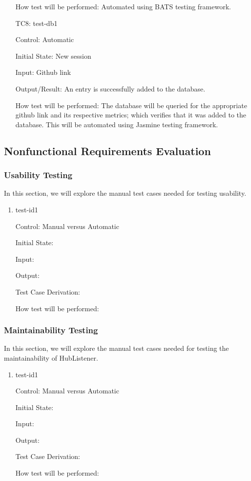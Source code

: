 \documentclass[12pt, titlepage]{article}
\begin{document}
\begin{enumerate}
How test will be performed: Automated using BATS testing framework. 

\item[TC8:] test-db1 

Control: Automatic 
					
Initial State: New session
					
Input: Github link
					
Output/Result: An entry is successfully added to the database.
				
How test will be performed: The database will be queried for the appropriate github link and its respective metrics; which verifies that it was added to the database. This will be automated using Jasmine testing framework.  

\end{enumerate}

\iffalse
\subsection{Nonfunctional Requirements Evaluation}

\subsubsection{Usability Testing}
In this section, we will explore the manual test cases needed for testing usability. 
\begin{enumerate}
\item{test-id1\\}

Control: Manual versus Automatic
					
Initial State: 
					
Input: 
					
Output: 

Test Case Derivation: 
					
How test will be performed: 
\end{enumerate}
\subsubsection{Maintainability  Testing}
In this section, we will explore the manual test cases needed for testing  the maintainability of HubListener. 
\begin{enumerate}
\item{test-id1\\}

Control: Manual versus Automatic
					
Initial State: 
					
Input: 
					
Output: 

Test Case Derivation: 
					
How test will be performed: 
\end{enumerate}
\end{document}

